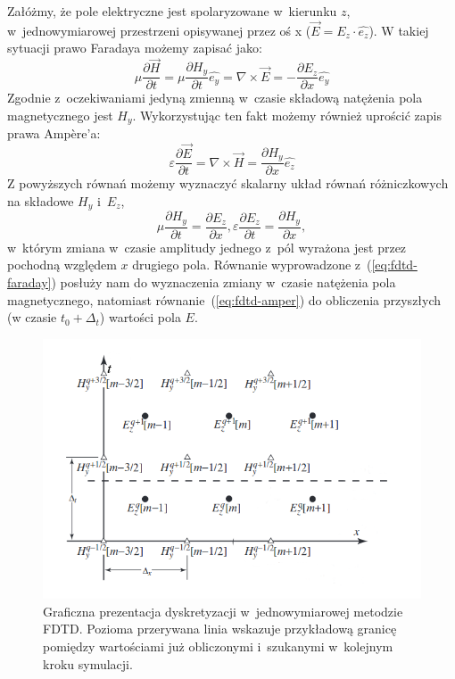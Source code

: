 Załóżmy, że pole elektryczne jest spolaryzowane w~kierunku $z$, w~jednowymiarowej przestrzeni opisywanej przez oś x ($\vec{E}=E_z \cdot \hat{e_z}$). W takiej sytuacji prawo Faradaya możemy zapisać jako:
\begin{equation}
\mu \frac{\partial \vec{H}}{\partial t}= \mu \frac{\partial H_y}{\partial t} \hat{e_y}= \nabla \times \vec{E} = - \frac{\partial E_z}{\partial x} \hat{e_y} 
\label{eq:fdtd-faraday}
\end{equation}
Zgodnie z~oczekiwaniami jedyną zmienną w~czasie składową natężenia pola magnetycznego jest $H_y$. Wykorzystując ten fakt możemy również uprościć zapis prawa Amp\`{e}re'a:
\begin{equation}
\varepsilon \frac{\partial \vec{E}}{\partial t}=\nabla \times \vec{H} = \frac{\partial H_y}{\partial x} \hat{e_z}
\label{eq:fdtd-amper}
\end{equation}
Z powyższych równań możemy wyznaczyć skalarny układ równań różniczkowych na składowe $H_y$ i~$E_z$,
\begin{equation}
\mu \frac{\partial H_y}{\partial t}=\frac{\partial E_z}{\partial x} ,
\varepsilon \frac{\partial E_z}{\partial t}=\frac{\partial H_y}{\partial x},
\end{equation} w~którym zmiana w~czasie amplitudy jednego z~pól wyrażona jest przez pochodną względem $x$ drugiego pola. Równanie wyprowadzone z~(\ref{eq:fdtd-faraday}) posłuży nam do wyznaczenia zmiany w~czasie natężenia pola magnetycznego, natomiast równanie~(\ref{eq:fdtd-amper}) do obliczenia przyszłych (w czasie $t_0 + \Delta_t$) wartości pola $E$.

\begin{figure}[htb]
\includegraphics[width=.9\textwidth]{subart/fdtd/leapfrog.png}
\caption{Graficzna prezentacja dyskretyzacji w~jednowymiarowej metodzie FDTD. Pozioma przerywana linia wskazuje przykładową granicę pomiędzy wartościami już obliczonymi i~szukanymi w~kolejnym kroku symulacji. }
\label{pic:leapfrog}
\end{figure}

